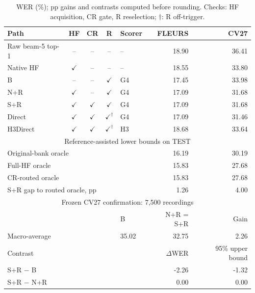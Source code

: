 \begin{table}[H]\centering\footnotesize
\caption{WER (\%); pp gains and contrasts computed before rounding. Checks: HF acquisition, CR gate, R reselection; $\dagger$: R off-trigger.}\label{tab:paths}
\setlength{\tabcolsep}{3pt}\renewcommand{\arraystretch}{1.00}
\begin{tabular}{@{}lccclrr@{}}\toprule
Path & HF & CR & R & Scorer & FLEURS & CV27\\\midrule
Raw beam-5 top-1 & -- & -- & -- & -- & 18.90 & 36.41\\
Native HF & $\checkmark$ & -- & -- & -- & 18.55 & 33.80\\
B & -- & -- & $\checkmark$ & G4 & 17.45 & 33.98\\
N+R & $\checkmark$ & -- & $\checkmark$ & G4 & 17.09 & 31.68\\
S+R & $\checkmark$ & $\checkmark$ & $\checkmark$ & G4 & 17.09 & 31.68\\
Direct & $\checkmark$ & $\checkmark$ & $\checkmark^{\dagger}$ & G4 & 17.09 & 31.46\\
H3Direct & $\checkmark$ & $\checkmark$ & $\checkmark^{\dagger}$ & H3 & 18.68 & 33.64\\
\midrule\multicolumn{7}{c}{Reference-assisted lower bounds on TEST}\\
\multicolumn{5}{l}{Original-bank oracle} & 16.19 & 30.19\\
\multicolumn{5}{l}{Full-HF oracle} & 15.83 & 27.68\\
\multicolumn{5}{l}{CR-routed oracle} & 15.83 & 27.68\\
\multicolumn{5}{l}{S+R gap to routed oracle, pp} & 1.26 & 4.00\\
\midrule\multicolumn{7}{c}{Frozen CV27 confirmation: 7,500 recordings}\\
\multicolumn{4}{l}{} & B & N+R = S+R & Gain\\\midrule
\multicolumn{4}{l}{Macro-average} & 35.02 & 32.75 & 2.26\\
\midrule\multicolumn{5}{l}{Contrast} & $\Delta$WER & 95\% upper bound\\
\multicolumn{5}{l}{S+R $-$ B} & -2.26 & -1.32\\
\multicolumn{5}{l}{S+R $-$ N+R} & 0.00 & 0.00\\
\bottomrule\end{tabular}\end{table}
